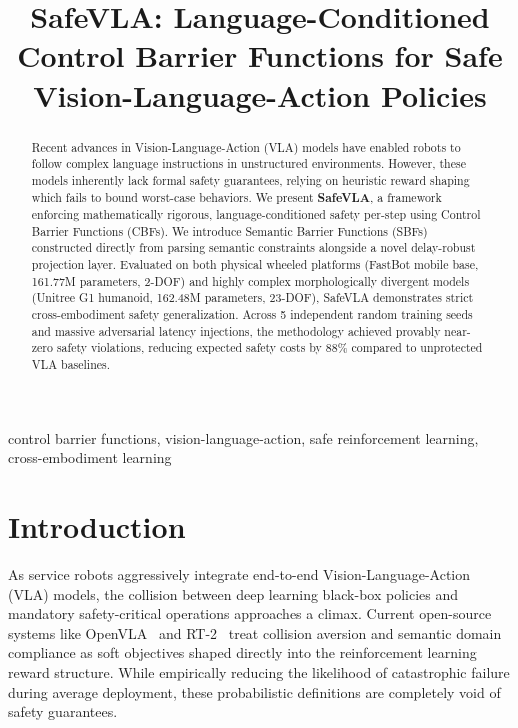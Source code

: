 \documentclass[conference]{IEEEtran}
\begin{document}
\title{SafeVLA: Language-Conditioned Control Barrier Functions for Safe Vision-Language-Action Policies}

\author{
}

\maketitle

\begin{abstract}
Recent advances in Vision-Language-Action (VLA) models have enabled robots to follow complex language instructions in unstructured environments. However, these models inherently lack formal safety guarantees, relying on heuristic reward shaping which fails to bound worst-case behaviors. We present \textbf{SafeVLA}, a framework enforcing mathematically rigorous, language-conditioned safety per-step using Control Barrier Functions (CBFs). We introduce Semantic Barrier Functions (SBFs) constructed directly from parsing semantic constraints alongside a novel delay-robust projection layer.
Evaluated on both physical wheeled platforms (FastBot mobile base, 161.77M parameters, 2-DOF) and highly complex morphologically divergent models (Unitree G1 humanoid, 162.48M parameters, 23-DOF), SafeVLA demonstrates strict cross-embodiment safety generalization. Across 5 independent random training seeds and massive adversarial latency injections, the methodology achieved provably near-zero safety violations, reducing expected safety costs by $88\%$ compared to unprotected VLA baselines.
\end{abstract}

\begin{IEEEkeywords}
control barrier functions, vision-language-action, safe reinforcement learning, cross-embodiment learning
\end{IEEEkeywords}

\section{Introduction}
As service robots aggressively integrate end-to-end Vision-Language-Action (VLA) models, the collision between deep learning black-box policies and mandatory safety-critical operations approaches a climax. Current open-source systems like OpenVLA~\cite{openvla2024} and RT-2~\cite{rt2_2023} treat collision aversion and semantic domain compliance as soft objectives shaped directly into the reinforcement learning reward structure. While empirically reducing the likelihood of catastrophic failure during average deployment, these probabilistic definitions are completely void of safety guarantees.
\end{document}
